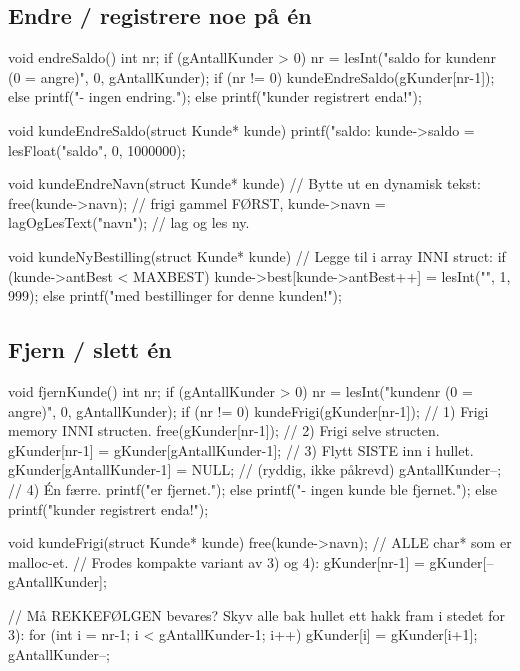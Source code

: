 \subsection{Endre / registrere noe på én}\label{sec:endre}
\begin{kode}
void endreSaldo()  {
  int nr;
  if (gAntallKunder > 0)  {
     nr = lesInt("\tEndre saldo for kundenr (0 = angre)", 0, gAntallKunder);
     if (nr != 0)  kundeEndreSaldo(gKunder[nr-1]);
     else          printf("\n\tOK - ingen endring.\n");
  } else
     printf("\n\tIngen kunder registrert enda!\n");
}

void kundeEndreSaldo(struct Kunde* kunde)  {
  printf("\n\tNaavaerende saldo: %
  kunde->saldo = lesFloat("\tNy saldo", 0, 1000000);
}

void kundeEndreNavn(struct Kunde* kunde)  {        //  Bytte ut en dynamisk tekst:
  free(kunde->navn);                               //    frigi gammel FØRST,
  kunde->navn = lagOgLesText("\tNytt navn");       //    lag og les ny.
}

void kundeNyBestilling(struct Kunde* kunde)  {     //  Legge til i array INNI struct:
  if (kunde->antBest < MAXBEST)
     kunde->best[kunde->antBest++] = lesInt("\tVarenr", 1, 999);
  else
     printf("\n\tFullt med bestillinger for denne kunden!\n");
}
\end{kode}

\subsection{Fjern / slett én}\label{sec:slett}
\begin{kode}
void fjernKunde()  {
  int nr;
  if (gAntallKunder > 0)  {
     nr = lesInt("\tFjern kundenr (0 = angre)", 0, gAntallKunder);
     if (nr != 0)  {
        kundeFrigi(gKunder[nr-1]);                 //  1) Frigi memory INNI structen.
        free(gKunder[nr-1]);                       //  2) Frigi selve structen.
        gKunder[nr-1] = gKunder[gAntallKunder-1];  //  3) Flytt SISTE inn i hullet.
        gKunder[gAntallKunder-1] = NULL;           //     (ryddig, ikke påkrevd)
        gAntallKunder--;                           //  4) Én færre.
        printf("\n\tKunden er fjernet.\n");
     } else
        printf("\n\tOK - ingen kunde ble fjernet.\n");
  } else
     printf("\n\tIngen kunder registrert enda!\n");
}

void kundeFrigi(struct Kunde* kunde)  {
  free(kunde->navn);                               //  ALLE char* som er malloc-et.
}
//  Frodes kompakte variant av 3) og 4):   gKunder[nr-1] = gKunder[--gAntallKunder];

//  Må REKKEFØLGEN bevares? Skyv alle bak hullet ett hakk fram i stedet for 3):
for (int i = nr-1;  i < gAntallKunder-1;  i++)  gKunder[i] = gKunder[i+1];
gAntallKunder--;
\end{kode}

